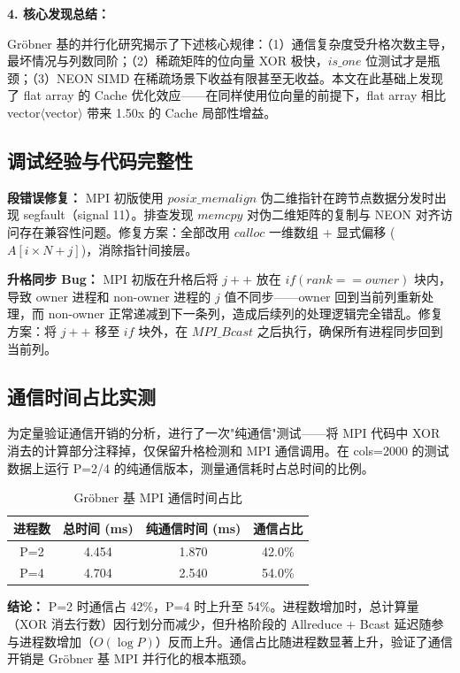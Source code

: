 \documentclass[a4paper]{article}
\begin{document}
\textbf{4. 核心发现总结：}

Gröbner 基的并行化研究揭示了下述核心规律：（1）通信复杂度受升格次数主导，最坏情况与列数同阶；（2）稀疏矩阵的位向量 XOR 极快，$is\_one$ 位测试才是瓶颈；（3）NEON SIMD 在稀疏场景下收益有限甚至无收益。本文在此基础上发现了 flat array 的 Cache 优化效应——在同样使用位向量的前提下，flat array 相比 vector$\langle$vector$\rangle$ 带来 1.50x 的 Cache 局部性增益。

\subsection{调试经验与代码完整性}

\textbf{段错误修复：} MPI 初版使用 $posix\_memalign$ 伪二维指针在跨节点数据分发时出现 segfault（signal 11）。排查发现 $memcpy$ 对伪二维矩阵的复制与 NEON 对齐访问存在兼容性问题。修复方案：全部改用 $calloc$ 一维数组 + 显式偏移 ($A[i \times N + j]$)，消除指针间接层。

\textbf{升格同步 Bug：} MPI 初版在升格后将 $j++$ 放在 $if (rank == owner)$ 块内，导致 owner 进程和 non-owner 进程的 $j$ 值不同步——owner 回到当前列重新处理，而 non-owner 正常递减到下一条列，造成后续列的处理逻辑完全错乱。修复方案：将 $j++$ 移至 $if$ 块外，在 $MPI\_Bcast$ 之后执行，确保所有进程同步回到当前列。

\subsection{通信时间占比实测}

为定量验证通信开销的分析，进行了一次"纯通信"测试——将 MPI 代码中 XOR 消去的计算部分注释掉，仅保留升格检测和 MPI 通信调用。在 cols=2000 的测试数据上运行 P=2/4 的纯通信版本，测量通信耗时占总时间的比例。

\begin{table}[H]
  \centering
  \caption{Gröbner 基 MPI 通信时间占比}
  \begin{tabular}{|c|c|c|c|}
  \hline
  \textbf{进程数} & \textbf{总时间 (ms)} & \textbf{纯通信时间 (ms)} & \textbf{通信占比} \\
  \hline
  P=2 & 4.454 & 1.870 & 42.0\% \\
  P=4 & 4.704 & 2.540 & 54.0\% \\
  \hline
  \end{tabular}
\end{table}

\textbf{结论：} P=2 时通信占 42\%，P=4 时上升至 54\%。进程数增加时，总计算量（XOR 消去行数）因行划分而减少，但升格阶段的 Allreduce + Bcast 延迟随参与进程数增加（$O(\log P)$）反而上升。通信占比随进程数显著上升，验证了通信开销是 Gröbner 基 MPI 并行化的根本瓶颈。
\end{document}
